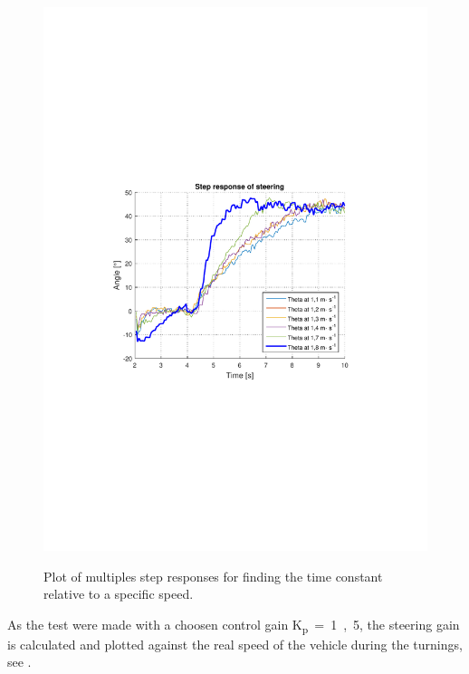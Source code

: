 \begin{figure}[H]
  \centering
  {
    \includegraphics[width=1.4\textwidth]{figures/plotStepResponseSteering.pdf}
  }
  \caption{Plot of multiples step responses for finding the time constant \si{\tau} relative to a specific speed.}
  \label{plotStepResponseSteering}
\end{figure}
%
As the test were made with a choosen control gain \si{K_p = 1,5}, the steering gain is calculated and plotted against the real speed of the vehicle during the turnings, see .
%
